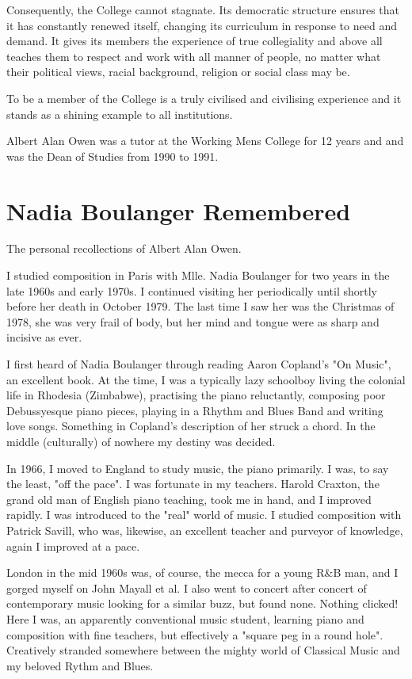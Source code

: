 \documentclass{article}
\begin{document}
Consequently, the College cannot stagnate.
Its democratic structure ensures that it has constantly renewed itself, changing its curriculum in response to need and demand.
It gives its members the experience of true collegiality and above all teaches them to respect and work with all manner of people, no matter what their political views, racial background, religion or social class may be.

To be a member of the College is a truly civilised and civilising experience and it stands as a shining example to all institutions.

Albert Alan Owen was a tutor at the Working Mens College for 12 years and and was the Dean of Studies from 1990 to 1991.

\pagebreak
\section{Nadia Boulanger Remembered}
The personal recollections of Albert Alan Owen.

I studied composition in Paris with Mlle. Nadia Boulanger for two years in the late 1960s and early 1970s.
I continued visiting her periodically until shortly before her death in October 1979.
The last time I saw her was the Christmas of 1978, she was very frail of body, but her mind and tongue were as sharp and incisive as ever.

I first heard of Nadia Boulanger through reading Aaron Copland's "On Music", an excellent book.
At the time, I was a typically lazy schoolboy living the colonial life in Rhodesia (Zimbabwe), practising the piano reluctantly, composing poor Debussyesque piano pieces, playing in a Rhythm and Blues Band and writing love songs.
Something in Copland's description of her struck a chord.
In the middle (culturally) of nowhere my destiny was decided.

In 1966, I moved to England to study music, the piano primarily.
I was, to say the least, "off the pace".
I was fortunate in my teachers.
Harold Craxton, the grand old man of English piano teaching, took me in hand, and I improved rapidly.
I was introduced to the "real" world of music.
I studied composition with Patrick Savill, who was, likewise, an excellent teacher and purveyor of knowledge, again I improved at a pace.

London in the mid 1960s was, of course, the mecca for a young R\&B man, and I gorged myself on John Mayall et al.
I also went to concert after concert of contemporary music looking for a similar buzz, but found none.
Nothing clicked! Here I was, an apparently conventional music student, learning piano and composition with fine teachers, but effectively a "square peg in a round hole".
Creatively stranded somewhere between the mighty world of Classical Music and my beloved Rythm and Blues.
\end{document}
